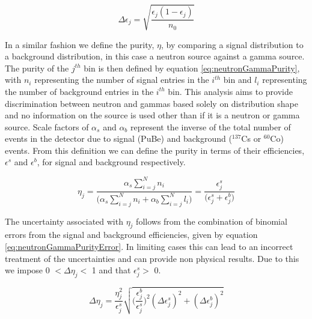 \begin{equation}
\Delta\epsilon_{j} = \sqrt{\frac{\epsilon_{j}(1 - \epsilon_{j})}{n_{0}}}
\label{eq:neutronGammaEffError}
\end{equation}

In a similar fashion we define the purity, $\eta$, by comparing a signal distribution to a background distribution, in this case a neutron source against a gamma source. The purity of the $j^{th}$ bin is then defined by equation \ref{eq:neutronGammaPurity}, with $n_{i}$ representing the number of signal entries in the $i^{th}$ bin and $l_{i}$ representing the number of background entries in the $i^{th}$ bin. This analysis aims to provide discrimination between neutron and gammas based solely on distribution shape and no information on the source is used other than if it is a neutron or gamma source. Scale factors of $\alpha_{s}$ and $\alpha_{b}$ represent the inverse of the total number of events in the detector due to signal (PuBe) and background ($^{137}$Cs or $^{60}$Co) events. From this definition we can define the purity in terms of their efficiencies, $\epsilon^{s}$ and $\epsilon^{b}$, for signal and background respectively.

\begin{equation}
\eta_{j} = \frac{\alpha_{s}\sum^{N}_{i=j}{n_{i}}}{\big(\alpha_{s}\sum^{N}_{i=j}{n_{i}} + \alpha_{b}\sum^{N}_{i=j}{l_{i}} \big)} = 
\frac{\epsilon^{s}_{j}}{\big(\epsilon^{s}_{j} + \epsilon^{b}_{j} \big)}
\label{eq:neutronGammaPurity}
\end{equation}

The uncertainty associated with $\eta_{j}$ follows from the combination of binomial errors from the signal and background efficiencies, given by equation \ref{eq:neutronGammaPurityError}. In limiting cases this can lead to an incorrect treatment of the uncertainties and can provide non physical results. Due to this we impose 0 $< \Delta\eta_{j} <$ 1 and that $\epsilon^{s}_{j} >$ 0.

\begin{equation}
\Delta\eta_{j} = \frac{\eta^{2}_{j}}{\epsilon^{s}_{j}}\sqrt{ \Big( \frac{\epsilon^{b}_{j}}{\epsilon^{s}_{j}} \Big)^{2} (\Delta\epsilon^{s}_{j})^{2} + (\Delta\epsilon^{b}_{j})^{2}  }
\label{eq:neutronGammaPurityError}
\end{equation}

